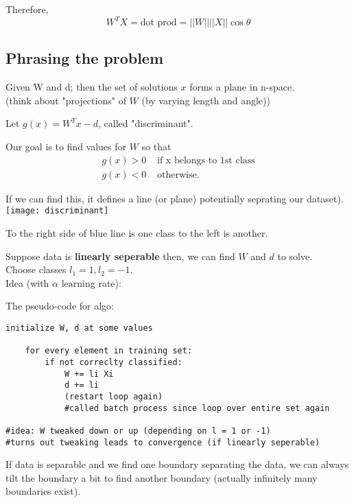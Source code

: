 \documentclass[12pt]{article}
\newcommand{\bt}[1]{\textbf{#1}} %
\newcommand{\eq}[1]{\begin{align*}#1\end{align*}} %
\renewcommand{\eq}[1]{\begin{align*}#1\end{align*}} %
\begin{document}
Therefore, 
$$W^T X = \text{dot prod} = ||W|| ||X|| \cos \theta$$

\subsection*{Phrasing the problem}

Given W and d; then the set of solutions $x$ forms a plane in n-space. \\
(think about "projections" of $W$ (by varying length and angle))

Let $g(x) = W^Tx - d$, called "discriminant". 

Our goal is to find values for $W$ so that 
\eq{g(x) > 0 & \text{ if x belongs to 1st class}\\
g(x) < 0 & \text{ otherwise}.
}

If we can find this, it defines a line (or plane) potentially seprating our dataset).\\
\texttt{[image: discriminant]}

To the right side of blue line is one class to the left is another.

Suppose data is \bt{linearly seperable} then, we can find $W$ and $d$ to solve.\\

Choose classes $l_1 = 1, l_2 = -1$.\\

Idea (with $\alpha$ learning rate): 



The pseudo-code for algo:

\begin{verbatim}
initialize W, d at some values 

    for every element in training set: 
        if not correclty classified:
            W += li Xi 
            d += li
            (restart loop again)
            #called batch process since loop over entire set again

#idea: W tweaked down or up (depending on l = 1 or -1)
#turns out tweaking leads to convergence (if linearly seperable)
\end{verbatim}

If data is separable and we find one boundary separating the data, we can always tilt the boundary a bit to find another boundary (actually infinitely many boundaries exist).
\end{document}
